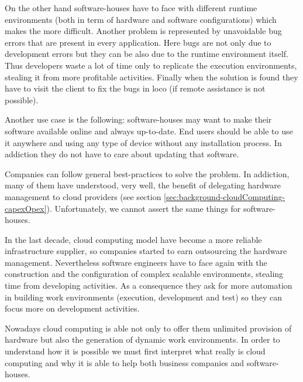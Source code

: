 On the other hand software-houses have to face with different runtime environments (both in term of
hardware and software configurations) which makes the  more difficult.
Another problem is represented by unavoidable bug errors that are present in every application. Here
bugs are not only due to development errors but they can be also due to the runtime environment itself.
Thus developers waste a lot of time only to replicate the execution environments, stealing it from
more profitable activities. Finally when the solution is found they have to visit the client to fix
the bugs in loco (if remote assistance is not possible).

Another use case is the following: software-houses may want to make their software available online
and always up-to-date. End users should be able to use it anywhere and using any type of device without
any installation process. In addiction they do not have to care about updating that software.

Companies can follow general best-practices to solve the problem. In addiction, many of them have
understood, very well, the benefit of delegating hardware management to cloud providers (see section
\ref{sec:background-cloudComputing-capexOpex}). Unfortunately, we cannot assert the same things for
software-houses.

In the last decade, cloud computing model have become a more reliable infrastructure supplier, so companies 
started to earn outsourcing the hardware management. Nevertheless software engineers have to face again
with the construction and the configuration of complex scalable environments, stealing time from developing
activities. As a consequence they ask for more automation in building work environments  (execution,
development and test) so they can focus more on development activities.

Nowadays cloud computing is able not only to offer them unlimited provision of hardware but also
the generation of dynamic work environments. In order to understand how it is possible we must first
interpret what really is cloud computing and why it is able to help both business companies and
software-houses.